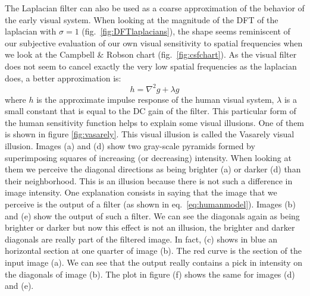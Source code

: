 The Laplacian filter can also be used as a coarse approximation of the behavior of the early visual system. When looking at the magnitude of the DFT of the laplacian with $\sigma=1$ (fig.~\ref{fig:DFTlaplacians}), the shape seems reminiscent of our subjective evaluation of our own visual sensitivity to spatial frequencies when we look at the Campbell \& Robson chart (fig.~\ref{fig:csfchart}). As the visual filter does not seem to cancel exactly the very low spatial frequencies as the laplacian does, a better approximation is:
\begin{equation}
	h = \nabla^2 g  + \lambda g
	\label{eq:humanmodel}
\end{equation}
where $h$ is the approximate impulse response of the human visual system, $\lambda$ is a small constant that is equal to the DC gain of the filter. This particular form of the human sensitivity function helps to explain some visual illusions. One of them is shown in figure \ref{fig:vasarely}. This visual illusion is called the Vasarely visual illusion. Images (a) and (d) show two gray-scale pyramids  formed by superimposing squares of increasing (or decreasing) intensity. When looking at them we perceive the diagonal directions as being brighter (a) or darker (d) than their neighborhood. This is an illusion because there is not such a difference in image intensity.  One explanation consists in saying that the image that we perceive is the output of a filter (as shown in eq.~\ref{eq:humanmodel}). Images (b) and (e) show the output of such a filter. We can see the diagonals again as being brighter or darker but now this effect is not an illusion, the brighter and darker diagonals are really part of the filtered image. In fact, (c) shows in blue an horizontal section at one quarter of image (b). The red curve is the section of the input image (a). We can see that the output really contains a pick in intensity on the diagonals of image (b). The plot in figure (f) shows the same for images (d) and (e).

